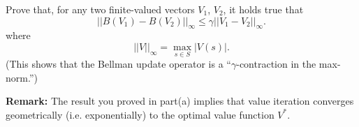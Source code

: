 \item {} Prove that, for any two finite-valued vectors $V_1$, 
$V_2$, it
holds true that
\[
   ||B(V_1) - B(V_2)||_\infty \leq \gamma ||V_1 - V_2||_\infty.
\]
where
\[
   ||V||_\infty = \max_{s \in S} |V(s)|.
\]
(This shows that the Bellman update operator is a
``$\gamma$-contraction in the max-norm.'')


\textbf{Remark:} The result you proved in part(a) implies that value iteration converges geometrically (i.e. exponentially) to the optimal value function $V^*$.


